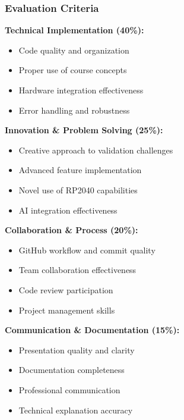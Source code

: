 \documentclass{beamer}
\begin{document}
\begin{frame}
\frametitle{Evaluation Criteria}
\textbf{Technical Implementation (40\%):}
\begin{itemize}
    \item Code quality and organization
    \item Proper use of course concepts
    \item Hardware integration effectiveness
    \item Error handling and robustness
\end{itemize}

\textbf{Innovation \& Problem Solving (25\%):}
\begin{itemize}
    \item Creative approach to validation challenges
    \item Advanced feature implementation
    \item Novel use of RP2040 capabilities
    \item AI integration effectiveness
\end{itemize}

\textbf{Collaboration \& Process (20\%):}
\begin{itemize}
    \item GitHub workflow and commit quality
    \item Team collaboration effectiveness
    \item Code review participation
    \item Project management skills
\end{itemize}

\textbf{Communication \& Documentation (15\%):}
\begin{itemize}
    \item Presentation quality and clarity
    \item Documentation completeness
    \item Professional communication
    \item Technical explanation accuracy
\end{itemize}
\end{frame}
\end{document}
